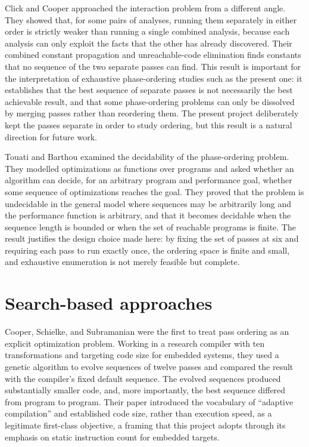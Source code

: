 Click and Cooper \cite{click1995} approached the interaction problem from a different angle. They showed that, for some pairs of analyses, running them separately in either order is strictly weaker than running a single combined analysis, because each analysis can only exploit the facts that the other has already discovered. Their combined constant propagation and unreachable-code elimination finds constants that no sequence of the two separate passes can find. This result is important for the interpretation of exhaustive phase-ordering studies such as the present one: it establishes that the best sequence of separate passes is not necessarily the best achievable result, and that some phase-ordering problems can only be dissolved by merging passes rather than reordering them. The present project deliberately kept the passes separate in order to study ordering, but this result is a natural direction for future work.

Touati and Barthou \cite{touati2006} examined the decidability of the phase-ordering problem. They modelled optimizations as functions over programs and asked whether an algorithm can decide, for an arbitrary program and performance goal, whether some sequence of optimizations reaches the goal. They proved that the problem is undecidable in the general model where sequences may be arbitrarily long and the performance function is arbitrary, and that it becomes decidable when the sequence length is bounded or when the set of reachable programs is finite. The result justifies the design choice made here: by fixing the set of passes at six and requiring each pass to run exactly once, the ordering space is finite and small, and exhaustive enumeration is not merely feasible but complete.

\section*{Search-based approaches}

Cooper, Schielke, and Subramanian \cite{cooper1999} were the first to treat pass ordering as an explicit optimization problem. Working in a research compiler with ten transformations and targeting code size for embedded systems, they used a genetic algorithm to evolve sequences of twelve passes and compared the result with the compiler's fixed default sequence. The evolved sequences produced substantially smaller code, and, more importantly, the best sequence differed from program to program. Their paper introduced the vocabulary of ``adaptive compilation'' and established code size, rather than execution speed, as a legitimate first-class objective, a framing that this project adopts through its emphasis on static instruction count for embedded targets.

